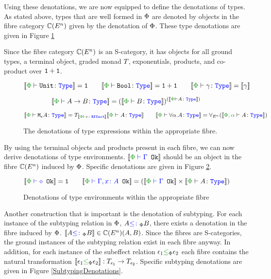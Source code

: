 \documentclass{Report}
\begin{document}
Using these denotations, we are now equipped to define the denotations of types. As stated above, types that are well formed in $\P$ are denoted by objects in the fibre category $\C(E^n)$ given by the denotation of $\P$. These type denotations are given in Figure \ref{TypeDenotations}
 
Since the fibre category $\C(E^n)$ is an S-category, it has objects for all ground types, a terminal object, graded monad $\T{}{}$, exponentials, products, and co-product over $\1+\1$.

\begin{figure}[H]
    \centering
    \begin{framed}
\[
    \deno{\typerelation{\P}{\U}{\type}} = \1
    \quad\quad
    \deno{\typerelation{\P}{\B}{\type}} = \1+\1
    \quad\quad
    \deno{\typerelation{\P}{\g}{\type}} = \deno{\g}
\] 

\[
    \deno{\typerelation{\P}{\ab}{\type}} = (\deno{\typerelation{\P}{B}{\type}})^{(\deno{\typerelation{\P}{A}{\type}})}
\]

\[
    \deno{\typerelation{\P}{\mea}{\type}} =\T{\deno{\typerelation{\P}{\e}{\effect}}}{\deno{\typerelation{\P}{A}{\type}}}
    \quad\quad
    \deno{\typerelation{\P}{\all{\a}{A}}{\type}} =\allEn(\deno{\typerelation{\P,\a}{A}{\type}})
\]


    \end{framed}
    \caption{The denotations of type expressions within the appropriate fibre.}
    \label{TypeDenotations}
\end{figure}

By using the terminal objects and products present in each fibre, we can now derive denotations of type environments. $\deno{\oke{\P}{\G}}$ should be an object in the fibre $\C(E^n)$ induced by $\P$. Specific denotations are given in Figure \ref{TypeEnvDenotations}.

\begin{figure}[H]
    \centering
    \begin{framed}
        \[
            \deno{\wellformedok{\P}{\nil}} = \1
            \quad\quad
            \deno{\wellformedok{\P}{\gax}} = (\deno{\wellformedok{\P}{\G}} \times \deno{\typerelation{\P}{A}{\type}})
        \]  
    \end{framed}

    \caption{Denotations of type environments within the appropriate fibre}
    \label{TypeEnvDenotations}
\end{figure}


Another construction that is important is the denotation of subtyping. For each instance of the subtyping relation in $\P$, $A\subtypep B$, there exists a denotation in the fibre induced by $\P$. $\deno{A\subtypep B} \in\C(E^n)(A, B)$. Since the fibres are S-categories, the ground instances of the subtyping relation exist in each fibre anyway. In addition, for each instance of the subeffect relation $\e_1\subeffectp \e_2$ each fibre contains the natural transformation $\dsep{\e_1}{\e_2}: \T{\e_1}{}\rightarrow \T{\e_2}{}$. Specific subtyping denotations are given in Figure \ref{SubtypingDenotations}.
\end{document}
